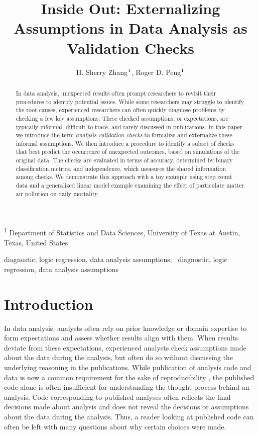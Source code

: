 \documentclass[
  12pt,
]{interact}
\title{Inside Out: Externalizing Assumptions in Data Analysis as
Validation Checks}
\author{H. Sherry Zhang$\textsuperscript{1}$, Roger D.
Peng$\textsuperscript{1}$}
\begin{document}
\captionsetup{labelsep=space}
\maketitle
\textsuperscript{1} Department of Statistics and Data
Sciences, University of Texas at Austin, Texas, United States
\begin{abstract}
In data analysis, unexpected results often prompt researchers to revisit
their procedures to identify potential issues. While some researchers
may struggle to identify the root causes, experienced researchers can
often quickly diagnose problems by checking a few key assumptions. These
checked assumptions, or expectations, are typically informal, difficult
to trace, and rarely discussed in publications. In this paper, we
introduce the term \emph{analysis validation checks} to formalize and
externalize these informal assumptions. We then introduce a procedure to
identify a subset of checks that best predict the occurrence of
unexpected outcomes, based on simulations of the original data. The
checks are evaluated in terms of accuracy, determined by binary
classification metrics, and independence, which measures the shared
information among checks. We demonstrate this approach with a toy
example using step count data and a generalized linear model example
examining the effect of particulate matter air pollution on daily
mortality.
\end{abstract}
\begin{keywords}
\def\sep{;\ }
diagnostic, logic regression, data analysis assumptions\sep 
diagnostic, logic regression, data analysis assumptions
\end{keywords}


\section{Introduction}\label{introduction}

In data analysis, analysts often rely on prior knowledge or domain
expertise to form expectations and assess whether results align with
them. When results deviate from these expectations, experienced analysts
check assumptions made about the data during the analysis, but often do
so without discussing the underlying reasoning in the publications.
While publication of analysis code and data is now a common requirement
for the sake of reproducibility \citep{peng2011reproducible}, the
published code alone is often insufficient for understanding the thought
process behind an analysis. Code corresponding to published analyses
often reflects the final decisions made about analysis and does not
reveal the decisions or assumptions about the data during the analysis.
Thus, a reader looking at published code can often be left with many
questions about why certain choices were made.
\end{document}
